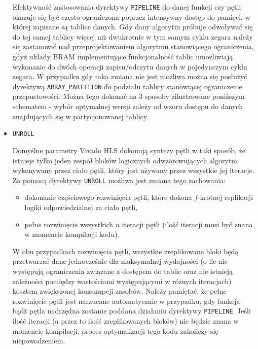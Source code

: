\begin{itemize}
Efektywność zastosowania dyrektywy \texttt{PIPELINE} do danej funkcji czy pętli okazuje się być często ograniczona poprzez intensywny dostęp do pamięci, w której zapisane są tablice danych. Gdy dany algorytm próbuje odwoływać się do tej samej tablicy więcej niż dwukrotnie w tym samym cyklu zegara należy się zastanowić nad przeprojektowaniem algorytmu stanowiącego ograniczenia, gdyż układy BRAM implementujące funkcjonalność tablic umożliwiają wykonanie do dwóch operacji zapisu/odczytu danych w pojedynczym cyklu zegara. W przypadku gdy taka zmiana nie jest możliwa można się posłużyć dyrektywą \texttt{ARRAY\_PARTITION} do podziału tablicy stanowiącej ograniczenie przepustowości. Można tego dokonać na 3 sposoby zilustrowane poniższym schematem - wybór optymalnej wersji zależy od wzoru dostępu do danych znajdujących się w partycjonowanej tablicy.

\item \texttt{UNROLL}

Domyślne parametry Vivado HLS dokonują syntezy pętli w taki sposób, że istnieje tylko jeden zespół bloków logicznych odwzorowujących algorytm wykonywany przez ciało pętli, który jest używany przez wszystkie jej iteracje. Za pomocą dyrektywy \texttt{UNROLL} możliwa jest zmiana tego zachowania:
\begin{itemize}
\item dokonanie częściowego rozwinięcia pętli, które dokona $f$-krotnej replikacji logiki odpowiedzialnej za ciało pętli,
\item pełne rozwinięcie wszystkich $n$ iteracji pętli (ilość iteracji musi być znana w momencie kompilacji kodu).  
\end{itemize}
W obu przypadkach rozwinięcia pętli, wszystkie zreplikowane bloki będą przetwarzać dane jednocześnie dla maksymalnej wydajności (o ile nie występują ograniczenia związane z dostępem do tablic oraz nie istnieją zależności pomiędzy wartościami występującymi w różnych iteracjach) kosztem zwiększonej konsumpcji zasobów. Należy pamiętać, że pełne rozwinięcie pętli jest narzucane automatycznie w przypadku, gdy funkcja bądź pętla nadrzędna zostanie poddana działaniu dyrektywy \texttt{PIPELINE}. Jeśli ilość iteracji (a przez to ilość zreplikowanych bloków) nie będzie znana w momencie kompilacji, proces optymalizacji tego kodu zakończy się niepowodzeniem.


\end{itemize}
